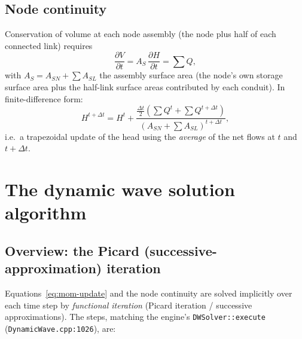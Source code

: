 \documentclass[11pt,a4paper]{article}
\begin{document}
\subsection{Node continuity}

Conservation of volume at each node assembly (the node plus half of each
connected link) requires
\begin{equation}
  \frac{\partial V}{\partial t}
  = A_{S}\,\frac{\partial H}{\partial t} = \sum Q,
\end{equation}
with $A_S = A_{SN} + \sum A_{SL}$ the assembly surface area (the node's own
storage surface area plus the half-link surface areas contributed by each
conduit). In finite-difference form:
\begin{equation}
  H^{t+\Delta t} = H^{t} +
  \frac{\tfrac{\Delta t}{2}\left(\sum Q^{t} + \sum Q^{t+\Delta t}\right)}
       {\left(A_{SN} + \sum A_{SL}\right)^{t+\Delta t}},
\end{equation}
i.e.\ a trapezoidal update of the head using the \emph{average} of the net
flows at $t$ and $t+\Delta t$.

\section{The dynamic wave solution algorithm}

\subsection{Overview: the Picard (successive-approximation) iteration}

Equations~\eqref{eq:mom-update} and the node continuity are solved implicitly
over each time step by \emph{functional iteration} (Picard iteration /
successive approximations). The steps, matching the engine's
\texttt{DWSolver::execute} (\texttt{DynamicWave.cpp:1026}), are:
\end{document}
